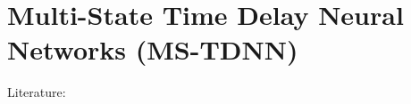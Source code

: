 \section{Multi-State Time Delay Neural Networks (MS-TDNN)}\label{sec:ms-tdnn}%
Literature: \cite{Haffner1992,Hild1993}
